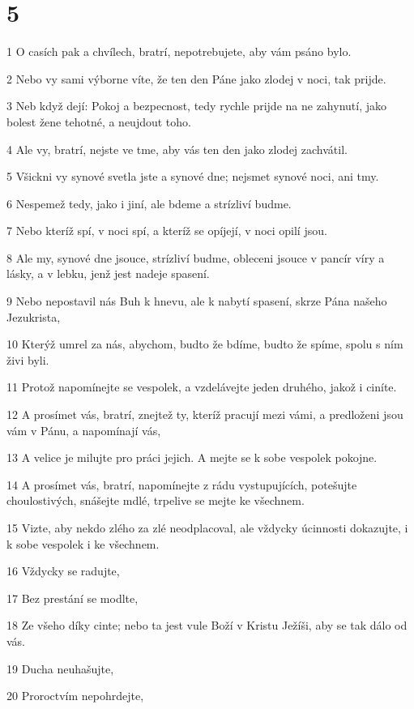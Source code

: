 \chapter{5}

\par 1 O casích pak a chvílech, bratrí, nepotrebujete, aby vám psáno bylo.
\par 2 Nebo vy sami výborne víte, že ten den Páne jako zlodej v noci, tak prijde.
\par 3 Neb když dejí: Pokoj a bezpecnost, tedy rychle prijde na ne zahynutí, jako bolest žene tehotné, a neujdout toho.
\par 4 Ale vy, bratrí, nejste ve tme, aby vás ten den jako zlodej zachvátil.
\par 5 Všickni vy synové svetla jste a synové dne; nejsmet synové noci, ani tmy.
\par 6 Nespemež tedy, jako i jiní, ale bdeme a strízliví budme.
\par 7 Nebo kteríž spí, v noci spí, a kteríž se opíjejí, v noci opilí jsou.
\par 8 Ale my, synové dne jsouce, strízliví budme, obleceni jsouce v pancír víry a lásky, a v lebku, jenž jest nadeje spasení.
\par 9 Nebo nepostavil nás Buh k hnevu, ale k nabytí spasení, skrze Pána našeho Jezukrista,
\par 10 Kterýž umrel za nás, abychom, budto že bdíme, budto že spíme, spolu s ním živi byli.
\par 11 Protož napomínejte se vespolek, a vzdelávejte jeden druhého, jakož i ciníte.
\par 12 A prosímet vás, bratrí, znejtež ty, kteríž pracují mezi vámi, a predloženi jsou vám v Pánu, a napomínají vás,
\par 13 A velice je milujte pro práci jejich. A mejte se k sobe vespolek pokojne.
\par 14 A prosímet vás, bratrí, napomínejte z rádu vystupujících, potešujte choulostivých, snášejte mdlé, trpelive se mejte ke všechnem.
\par 15 Vizte, aby nekdo zlého za zlé neodplacoval, ale vždycky úcinnosti dokazujte, i k sobe vespolek i ke všechnem.
\par 16 Vždycky se radujte,
\par 17 Bez prestání se modlte,
\par 18 Ze všeho díky cinte; nebo ta jest vule Boží v Kristu Ježíši, aby se tak dálo od vás.
\par 19 Ducha neuhašujte,
\par 20 Proroctvím nepohrdejte,
